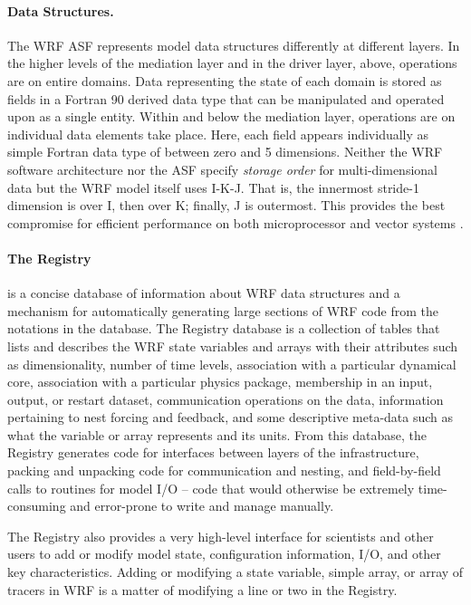 \paragraph{Data Structures.} \label{ds} The WRF ASF represents model
data structures differently at different layers.  In the higher levels
of the mediation layer and in the driver layer, above, operations are
on entire domains. Data representing the state of each domain is stored
as fields in a Fortran 90 derived data type that can be manipulated and
operated upon as a single entity.  Within and below the mediation
layer, operations are on individual data elements take place. Here,
each field appears individually as simple Fortran data type of between
zero and 5 dimensions.  Neither the WRF software architecture nor the
ASF specify {\em storage order} for multi-dimensional data but the WRF model itself
uses I-K-J. That is, the innermost stride-1 dimension is over I, then over
K; finally, J is outermost. This provides
the best compromise for efficient performance on both microprocessor and
vector systems \citep{michalak01}.

\paragraph{The Registry}\label{registry}
is a concise database of information about WRF data
structures and a mechanism for automatically generating large sections
of WRF code from the notations in the database.  The Registry database
is a collection of tables that lists and describes the WRF state
variables and arrays with their attributes such as dimensionality,
number of time levels, association with a particular dynamical core,
association with a particular physics package, membership in an input,
output, or restart dataset, communication operations on the data, information pertaining to nest forcing and feedback, and
some descriptive meta-data such as what the variable or array
represents and its units. From this database, the Registry generates
code for interfaces between layers of the infrastructure, packing and
unpacking code for communication and nesting, and field-by-field calls
to routines for model I/O -- code that would otherwise be extremely
time-consuming and error-prone to write and manage manually. 

The Registry also provides a very high-level interface for scientists
and other users to add or modify model state, configuration
information, I/O, and other key characteristics.  Adding or modifying a
state variable, simple array, or array of tracers in WRF is a matter of
modifying a line or two in the Registry.

